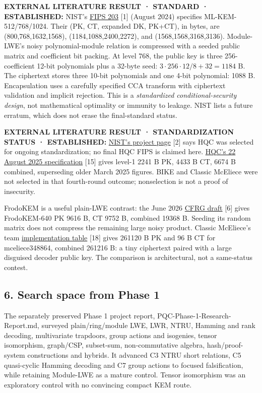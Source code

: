 \documentclass[
  10pt,
  a4paper,
]{article}
\begin{document}
\textbf{EXTERNAL LITERATURE RESULT · STANDARD · ESTABLISHED:} NIST's
\href{https://csrc.nist.gov/pubs/fips/203/final}{FIPS 203} {[}1{]}
(August 2024) specifies ML-KEM-512/768/1024. Their (PK, CT, expanded DK,
PK+CT), in bytes, are (800,768,1632,1568), (1184,1088,2400,2272), and
(1568,1568,3168,3136). Module-LWE's noisy polynomial-module relation is
compressed with a seeded public matrix and coefficient bit packing. At
level 768, the public key is three 256-coefficient 12-bit polynomials
plus a 32-byte seed: \(3\cdot256\cdot12/8+32=1184\) B. The ciphertext
stores three 10-bit polynomials and one 4-bit polynomial: 1088 B.
Encapsulation uses a carefully specified CCA transform with ciphertext
validation and implicit rejection. This is a \emph{standardized
conditional-security design}, not mathematical optimality or immunity to
leakage. NIST lists a future erratum, which does not erase the
final-standard status.

\textbf{EXTERNAL LITERATURE RESULT · STANDARDIZATION STATUS ·
ESTABLISHED:}
\href{https://csrc.nist.gov/projects/post-quantum-cryptography}{NIST's
project page} {[}2{]} says HQC was selected for ongoing standardization;
no final HQC FIPS is claimed here.
\href{https://pqc-hqc.org/doc/hqc_specifications_2025_08_22.pdf}{HQC's
22 August 2025 specification} {[}15{]} gives level-1 2241 B PK, 4433 B
CT, 6674 B combined, superseding older March 2025 figures. BIKE and
Classic McEliece were not selected in that fourth-round outcome;
nonselection is not a proof of insecurity.

FrodoKEM is a useful plain-LWE contrast: the June 2026
\href{https://datatracker.ietf.org/doc/draft-longa-cfrg-frodokem/}{CFRG
draft} {[}6{]} gives FrodoKEM-640 PK 9616 B, CT 9752 B, combined 19368
B. Seeding its random matrix does not compress the remaining large noisy
product. Classic McEliece's team
\href{https://classic.mceliece.org/impl.html}{implementation table}
{[}18{]} gives 261120 B PK and 96 B CT for mceliece348864, combined
261216 B: a tiny ciphertext paired with a large disguised decoder public
key. The comparison is architectural, not a same-status contest.

\hypertarget{search-space-from-phase-1}{%
\subsection{6. Search space from Phase
1}\label{search-space-from-phase-1}}

The separately preserved Phase 1 project report,
PQC-Phase-1-Research-Report.md, surveyed plain/ring/module LWE, LWR,
NTRU, Hamming and rank decoding, multivariate trapdoors, group actions
and isogenies, tensor isomorphism, graph/CSP, subset-sum,
non-commutative algebra, hash/proof-system constructions and hybrids. It
advanced C3 NTRU short relations, C5 quasi-cyclic Hamming decoding and
C7 group actions to focused falsification, while retaining Module-LWE as
a mature control. Tensor isomorphism was an exploratory control with no
convincing compact KEM route.
\end{document}
